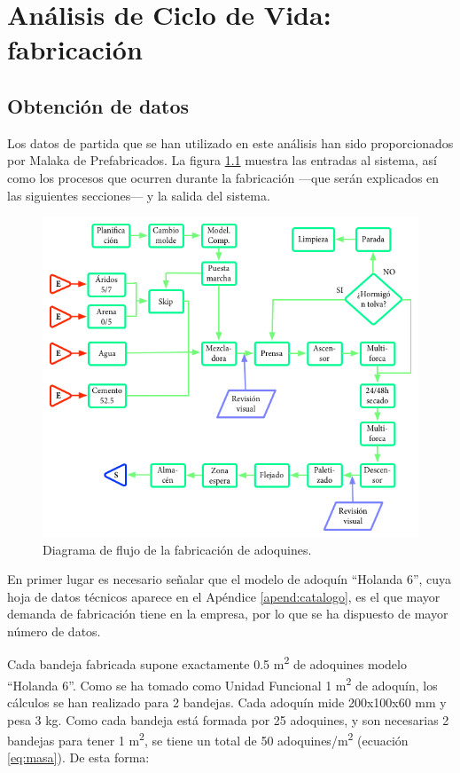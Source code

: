 \chapter{Análisis de Ciclo de Vida: fabricación}

\section{Obtención de datos}
Los datos de partida que se han utilizado en este análisis han sido proporcionados por Malaka de Prefabricados. La figura \ref{fig:diagrama_de_flujo} muestra las entradas al sistema, así como los procesos que ocurren durante la fabricación —que serán explicados en las siguientes secciones— y la salida del sistema.

\begin{figure}[!htb]
\centering
\includegraphics[width=15cm]{diagrama.png}
\caption{Diagrama de flujo de la fabricación de adoquines.}
\label{fig:diagrama_de_flujo}
\end{figure}

En primer lugar es necesario señalar que el modelo de adoquín ``Holanda 6'', cuya hoja de datos técnicos aparece en el Apéndice \ref{apend:catalogo}, es el que mayor demanda de fabricación tiene en la empresa, por lo que se ha dispuesto de mayor número de datos.

Cada bandeja fabricada supone exactamente 0.5 \si{m^2} de adoquines modelo ``Holanda 6''. Como se ha tomado como Unidad Funcional 1 \si{m^2} de adoquín, los cálculos se han realizado para 2 bandejas. Cada adoquín mide 200x100x60 \si{mm} y pesa 3 \si{kg}. Como cada bandeja está formada por 25 adoquines, y son necesarias 2 bandejas para tener 1 \si{m^2}, se tiene un total de 50 adoquines/\si{m^2} (ecuación \ref{eq:masa}). De esta forma:

